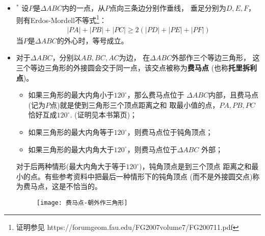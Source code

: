 \begin{itemize}[leftmargin=\inteval{\myitemleftmargin}pt,itemsep=
   \inteval{\myitemitempsep}pt,topsep=\inteval{\myitemtopsep}pt]
$ P $点是$ \Delta ABC $的垂心。\\
 当$ \lambda_1=\sin A,\ \lambda_2=\sin B,\ \lambda_3=
\sin C $时，
\begin{align*}
    x &=\dfrac{(\sin A)x_1+(\sin B)x_2+(\sin C)x_3}{\sin A+\sin B+
        \sin C}=\dfrac{ax_1+bx_2+cx_3}{a+b+c} \\ 
    y &=\dfrac{(\sin A)y_1+(\sin B)y_2+(\sin C)y_3}{\sin A+\sin B+
        \sin C}=\dfrac{ay_1+by_2+cy_3}{a+b+c}
\end{align*}
$ P $点是$ \Delta ABC $的内心。\\
 当$ \lambda_1=\sin 2A,\ \lambda_2=\sin 2B,\ \lambda_3=
\sin 2C $时，
\begin{align*}
    x &=\dfrac{(\sin 2A)x_1+(\sin 2B)x_2+(\sin 2C)x_3}{\sin 2A+
        \sin 2B+\sin 2C} \\
    y &=\dfrac{(\sin 2A)y_1+(\sin 2B)y_2+(\sin 2C)y_3}{\sin 2A+
        \sin 2B+\sin 2C}
\end{align*}
$ P $点是$ \Delta ABC $的外心。

\item $^*$ 设$ P $是$ \Delta ABC $内的一点，从$ P $点向三条边分别作垂线，
垂足分别为$ D,E,F $，则有Erdos-Mordell不等式\footnote{证明参见
https://forumgeom.fau.edu/FG2007volume7/FG200711.pdf }：
\begin{gather*}
    |PA|+|PB|+|PC|\geq 2(|PD|+|PE|+|PF|)
\end{gather*}
当$ P $是$ \Delta ABC $的外心时，等号成立。

\item 对于$ \Delta ABC $，分别以$ AB,BC,AC $为边，
在$ \Delta ABC $外部作三个等边三角形，
这三个等边三角形的外接圆会交于同一点，该交点被称为\textbf{费马点}
(也称\textbf{托里拆利点})。
\begin{itemize}[itemsep=-3pt]
\item 如果三角形的最大内角小于$ 120^{\circ} $，那么费马点位于
$ \Delta ABC $内部，且费马点(记为$ P $点)就是使到三角形三个顶点距离之和
取最小值的点，$ PA,PB,PC $恰好互成$ 120^{\circ} $.
(证明见本书第\pageref{费马点求偏导}页)；
\item 如果三角形的最大内角等于$ 120^{\circ} $，则费马点位于钝角顶点；
\item 如果三角形的最大内角大于$ 120^{\circ} $，则费马点位于$ \Delta ABC $
外部；
\end{itemize}
对于后两种情形(最大内角大于等于$ 120^{\circ} $)，钝角顶点是到三个顶点
距离之和最小的点。有些参考资料中把最后一种情形下的钝角顶点
(而不是外接圆交点)称为费马点，这是不恰当的。
\begin{figure}[!h]
    \centering
    \texttt{[image: 费马点-朝外作三角形]}
    \label{费马点朝内朝外两种}
\end{figure}


\end{itemize}
